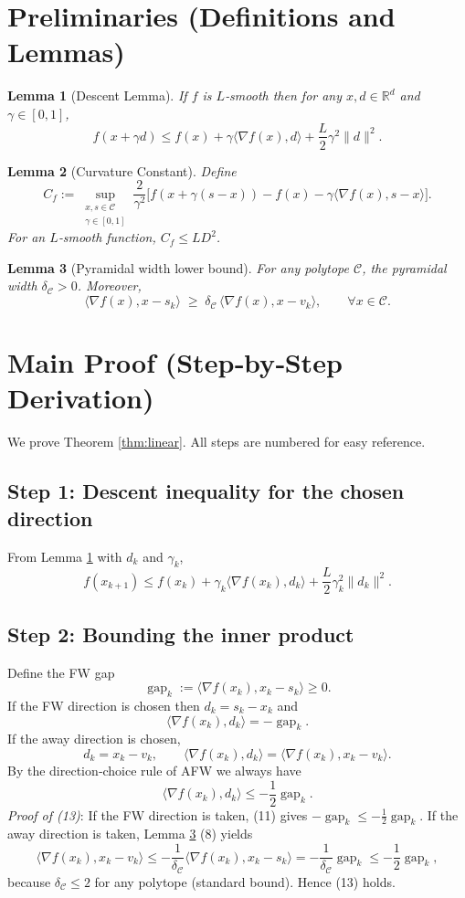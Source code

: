 \documentclass{article}
\newtheorem{lemma}{Lemma}
\newcommand{\R}{\mathbb{R}}
\newcommand{\C}{\mathcal{C}}
\newcommand{\gap}{\operatorname{gap}}
\begin{document}
\section*{Preliminaries (Definitions and Lemmas)}
\begin{lemma}[Descent Lemma]\label{lem:descent}
If $f$ is $L$‑smooth then for any $x,d\in\R^{d}$ and $\gamma\in[0,1]$,
\[
f(x+\gamma d)\le f(x)+\gamma\langle \nabla f(x),d\rangle +\frac{L}{2}\gamma^{2}\|d\|^{2}.
\tag{7}
\]
\end{lemma}
\begin{lemma}[Curvature Constant]\label{lem:curv}
Define
\[
C_{f}:=\sup_{\substack{x,s\in\C\\ \gamma\in[0,1]}}
\frac{2}{\gamma^{2}}\bigl[f(x+\gamma(s-x))-f(x)-\gamma\langle\nabla f(x),s-x\rangle\bigr].
\]
For an $L$‑smooth function, $C_{f}\le L D^{2}$.
\end{lemma}
\begin{lemma}[Pyramidal width lower bound]\label{lem:pyr}
For any polytope $\C$, the pyramidal width $\delta_{\C}>0$.
Moreover,
\[
\langle \nabla f(x),x-s_{k}\rangle \;\ge\; \delta_{\C}\,
\langle \nabla f(x),x-v_{k}\rangle ,
\qquad\forall x\in\C.
\tag{8}
\]
\end{lemma}

\section*{Main Proof (Step‑by‑Step Derivation)}
We prove Theorem \ref{thm:linear}.  All steps are numbered for easy reference.

\subsection*{Step 1: Descent inequality for the chosen direction}
From Lemma \ref{lem:descent} with $d_{k}$ and $\gamma_{k}$,
\[
f(x_{k+1})\le f(x_{k})+\gamma_{k}\langle\nabla f(x_{k}),d_{k}\rangle
+\frac{L}{2}\gamma_{k}^{2}\|d_{k}\|^{2}.
\tag{9}
\]

\subsection*{Step 2: Bounding the inner product}
Define the FW gap
\[
\gap_{k}:=\langle \nabla f(x_{k}),x_{k}-s_{k}\rangle\ge0.
\tag{10}
\]
If the FW direction is chosen then $d_{k}=s_{k}-x_{k}$ and
\[
\langle\nabla f(x_{k}),d_{k}\rangle = -\gap_{k}.
\tag{11}
\]
If the away direction is chosen,
\[
d_{k}=x_{k}-v_{k},\qquad
\langle\nabla f(x_{k}),d_{k}\rangle = \langle\nabla f(x_{k}),x_{k}-v_{k}\rangle .
\tag{12}
\]
By the direction‑choice rule of AFW we always have
\[
\langle\nabla f(x_{k}),d_{k}\rangle \le -\frac{1}{2}\gap_{k}.
\tag{13}
\]
\emph{Proof of (13)}:  
If the FW direction is taken, (11) gives $-\gap_{k}\le -\frac12\gap_{k}$.  
If the away direction is taken, Lemma \ref{lem:pyr} (8) yields
\[
\langle\nabla f(x_{k}),x_{k}-v_{k}\rangle 
\le -\frac{1}{\delta_{\C}}\langle\nabla f(x_{k}),x_{k}-s_{k}\rangle
= -\frac{1}{\delta_{\C}}\gap_{k}
\le -\frac12\gap_{k},
\]
because $\delta_{\C}\le 2$ for any polytope (standard bound). Hence (13) holds.
\end{document}

